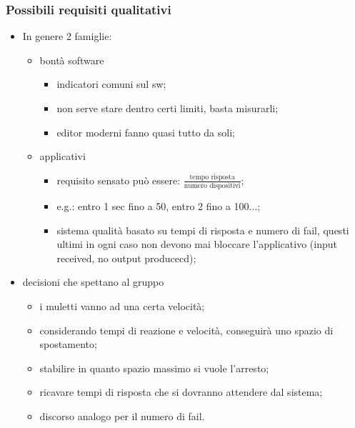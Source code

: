     \subsubsection{Possibili requisiti qualitativi}
        \begin{itemize}
            \item In genere 2 famiglie:
                \begin{itemize}
                    \item bontà software
                        \begin{itemize}
                            \item indicatori comuni sul sw;
                            \item non serve stare dentro certi limiti, basta misurarli;
                            \item editor moderni fanno quasi tutto da soli;
                        \end{itemize}
                    \item applicativi
                        \begin{itemize}
                            \item requisito sensato può essere: $\frac{\text{tempo risposta}}{\text{numero dispositivi}}$;
                            \item e.g.: entro 1 sec fino a 50, entro 2 fino a 100...;
                            \item sistema qualità basato su tempi di risposta e numero di fail, questi ultimi in ogni caso non devono mai bloccare l'applicativo (input received, no output producecd);
                        \end{itemize}
                \end{itemize}
            \item decisioni che spettano al gruppo
                \begin{itemize}
                    \item i muletti vanno ad una certa velocità;
                    \item considerando tempi di reazione e velocità, conseguirà uno spazio di spostamento;
                    \item stabilire in quanto spazio massimo si vuole l'arresto;
                    \item ricavare tempi di risposta che si dovranno attendere dal sistema;
                    \item discorso analogo per il numero di fail.
                \end{itemize}
        \end{itemize}

